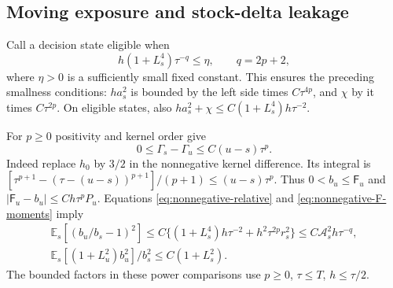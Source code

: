 \documentclass[11pt,a4paper]{amsart}
\theoremstyle{plain}
\theoremstyle{definition}
\theoremstyle{remark}
\newcommand{\EE}{\mathbb{E}}
\newcommand{\Es}{\EE_s}
\begin{document}
\subsection{Moving exposure and stock-delta leakage}
Call a decision state eligible when
\begin{equation}\label{eq:nonnegative-eligibility}
 h(1+L_s^4)\tau^{-q}\le\eta,\qquad q=2p+2,
\end{equation}
where $\eta>0$ is a sufficiently small fixed constant. This ensures the preceding smallness conditions: $ha_s^2$ is bounded by the left side times $C\tau^{4p}$, and $\chi$ by it times $C\tau^{2p}$. On eligible states, also $ha_s^2+\chi\le C(1+L_s^4)h\tau^{-2}$.

For $p\ge0$ positivity and kernel order give
\begin{equation}\label{eq:nonnegative-Gamma-translation}
 0\le\Gamma_s-\Gamma_u\le C(u-s)\tau^p.
\end{equation}
Indeed replace $h_0$ by $3/2$ in the nonnegative kernel difference. Its integral is
$[\tau^{p+1}-(\tau-(u-s))^{p+1}]/(p+1)\le(u-s)\tau^p$. Thus
$0<b_u\le\mathsf F_u$ and $|\mathsf F_u-b_u|\le Ch\tau^pP_u$. Equations \eqref{eq:nonnegative-relative} and \eqref{eq:nonnegative-F-moments} imply
\begin{equation}\label{eq:nonnegative-b-moments}
 \begin{gathered}
 \Es[(b_u/b_s-1)^2]
 \le C\{(1+L_s^4)h\tau^{-2}+h^2\tau^{2p}r_s^2\}
 \le C\mathcal A_s^2h\tau^{-q},\\
 \Es[(1+L_u^2)b_u^2]/b_s^2\le C(1+L_s^2).
 \end{gathered}
\end{equation}
The bounded factors in these power comparisons use $p\ge0$, $\tau\le T$, $h\le\tau/2$.
\end{document}
